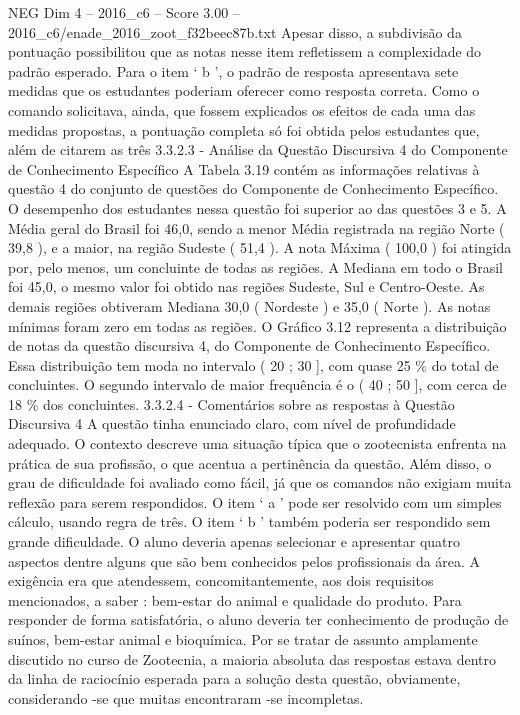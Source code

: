 \begin{textsample}{NEG Dim 4 – 2016\_c6 – Score 3.00 – 2016\_c6/enade\_2016\_zoot\_f32beec87b.txt}
Apesar disso, a subdivisão da pontuação possibilitou que as notas nesse item refletissem a complexidade do padrão esperado.
Para o item ‘ b ’, o padrão de resposta apresentava sete medidas que os estudantes poderiam oferecer como resposta correta.
Como o comando solicitava, ainda, que fossem explicados os efeitos de cada uma das medidas propostas, a pontuação completa só foi obtida pelos estudantes que, além de citarem as três 3.3.2.3 - Análise da Questão Discursiva 4 do Componente de Conhecimento Específico A Tabela 3.19 contém as informações relativas à questão 4 do conjunto de questões do Componente de Conhecimento Específico.
O desempenho dos estudantes nessa questão foi superior ao das questões 3 e 5.
A Média geral do Brasil foi 46,0, sendo a menor Média registrada na região Norte ( 39,8 ), e a maior, na região Sudeste ( 51,4 ).
A nota Máxima ( 100,0 ) foi atingida por, pelo menos, um concluinte de todas as regiões.
A Mediana em todo o Brasil foi 45,0, o mesmo valor foi obtido nas regiões Sudeste, Sul e Centro-Oeste.
As demais regiões obtiveram Mediana 30,0 ( Nordeste ) e 35,0 ( Norte ).
As notas mínimas foram zero em todas as regiões.
O Gráfico 3.12 representa a distribuição de notas da questão discursiva 4, do Componente de Conhecimento Específico.
Essa distribuição tem moda no intervalo ( 20 ; 30 ], com quase 25 \% do total de concluintes.
O segundo intervalo de maior frequência é o ( 40 ; 50 ], com cerca de 18 \% dos concluintes. 3.3.2.4 - Comentários sobre as respostas à Questão Discursiva 4 A questão tinha enunciado claro, com nível de profundidade adequado.
O contexto descreve uma situação típica que o zootecnista enfrenta na prática de sua profissão, o que acentua a pertinência da questão.
Além disso, o grau de dificuldade foi avaliado como fácil, já que os comandos não exigiam muita reflexão para serem respondidos.
O item ‘ a ’ pode ser resolvido com um simples cálculo, usando regra de três.
O item ‘ b ’ também poderia ser respondido sem grande dificuldade.
O aluno deveria apenas selecionar e apresentar quatro aspectos dentre alguns que são bem conhecidos pelos profissionais da área.
A exigência era que atendessem, concomitantemente, aos dois requisitos mencionados, a saber : bem-estar do animal e qualidade do produto.
Para responder de forma satisfatória, o aluno deveria ter conhecimento de produção de suínos, bem-estar animal e bioquímica.
Por se tratar de assunto amplamente discutido no curso de Zootecnia, a maioria absoluta das respostas estava dentro da linha de raciocínio esperada para a solução desta questão, obviamente, considerando -se que muitas encontraram -se incompletas.

\end{textsample}

